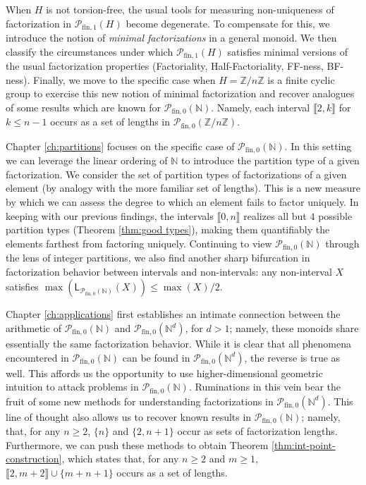 \documentclass{report}
\newcommand{\NN}{\mathbb{N}}
\renewcommand{\P}{\mathcal{P}}
\newcommand{\ZZ}{\mathbb{Z}}
\newcommand{\llb}{\llbracket}
\newcommand{\rrb}{\rrbracket}
\newcommand{\fin}{\textrm{fin}}
\newcommand{\fun}{{\textrm{fin}, 1}}
\newcommand{\fon}{{\textrm{fin}, 0}}
\renewcommand{\:}{\text{:}}
\newcommand{\PN}{{\P_{\fin,0}(\NN)}}
\theoremstyle{definition}
\begin{document}
When $H$ is not torsion-free, the usual tools for measuring non-uniqueness of factorization in $\P_\fun(H)$ become degenerate.
To compensate for this, we introduce the notion of \textit{minimal factorizations} in a general monoid.
We then classify the circumstances under which $\P_\fun(H)$ satisfies minimal versions of the usual factorization properties (Factoriality, Half-Factoriality, FF-ness, BF-ness).  
Finally, we move to the specific case when $H = \ZZ/n\ZZ$ is a finite cyclic group to exercise this new notion of minimal factorization and recover analogues of some results which are known for $\PN$.
Namely, each interval $\llb 2,k \rrb$ for $k\le n-1$ occurs as a set of lengths in $\P_\fon(\ZZ/n\ZZ)$.

Chapter \ref{ch:partitions} focuses on the specific case of $\PN$.
In this setting we can leverage the linear ordering of $\NN$ to introduce the partition type of a given factorization.  
We consider the set of partition types of factorizations of a given element (by analogy with the more familiar set of lengths).
This is a new measure by which we can assess the degree to which an element fails to factor uniquely.  
In keeping with our previous findings, the intervals $\llb 0,n \rrb$ realizes all but $4$ possible partition types (Theorem \ref{thm:good types}), making them quantifiably the elements farthest from factoring uniquely.
Continuing to view $\PN$ through the lens of integer partitions, we also find another sharp bifurcation in factorization behavior between intervals and non-intervals: any non-interval $X$ satisfies $\max(\mathsf{L}_{\PN}(X) )\le \max(X)/2$.

Chapter \ref{ch:applications} first establishes an intimate connection between the arithmetic of $\PN$ and $\P_\fon(\NN^d)$, for $d>1$; namely, these monoids share essentially the same factorization behavior.  
While it is clear that all phenomena encountered in $\PN$ can be found in $\P_\fon(\NN^d)$, the reverse is true as well.  
This affords us the opportunity to use higher-dimensional geometric intuition to attack problems in $\PN$.
Ruminations in this vein bear the fruit of some new methods for understanding factorizations in $\P_\fon(\NN^d)$.
This line of thought also allows us to recover known results in $\PN$; namely, that, for any $n\ge 2$, $\{n\}$ and $\{2,n+1\}$ occur as sets of factorization lengths.
Furthermore, we can push these methods to obtain Theorem \ref{thm:int-point-construction}, which states that, for any $n\ge 2$ and $m\ge 1$, $\llb 2,m+2 \rrb \cup \{m+n+1\}$ occurs as a set of lengths.
\end{document}
